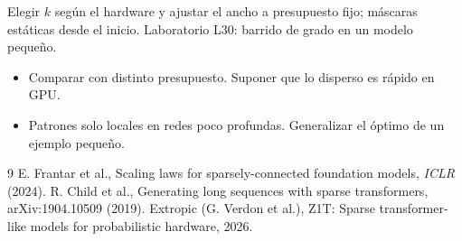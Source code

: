 \documentclass[11pt,a4paper]{article}
\begin{document}
\begin{aplicacion}
Elegir $k$ según el hardware y ajustar el ancho a presupuesto fijo; máscaras estáticas desde el inicio. Laboratorio L30: barrido de grado en un modelo pequeño.
\end{aplicacion}

\begin{error}
\begin{itemize}[nosep]
\item Comparar con distinto presupuesto. \quad Suponer que lo disperso es rápido en GPU.
\item Patrones solo locales en redes poco profundas. \quad Generalizar el óptimo de un ejemplo pequeño.
\end{itemize}
\end{error}

\begin{thebibliography}{9}\small
{} E. Frantar et al., Scaling laws for sparsely-connected foundation models, \emph{ICLR} (2024).
 R. Child et al., Generating long sequences with sparse transformers, arXiv:1904.10509 (2019).
 Extropic (G. Verdon et al.), Z1T: Sparse transformer-like models for probabilistic hardware, 2026.
\end{thebibliography}
\end{document}

